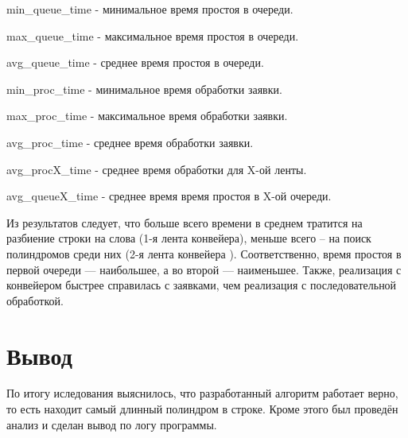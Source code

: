 
\noindent min\_queue\_time - минимальное время простоя в очереди.

\noindent max\_queue\_time - максимальное время простоя в очереди.

\noindent avg\_queue\_time - среднее время простоя в очереди.

\noindent min\_proc\_time - минимальное время обработки заявки.

\noindent max\_proc\_time - максимальное время обработки заявки.

\noindent avg\_proc\_time - среднее время обработки заявки.

\noindent avg\_procX\_time - среднее время обработки для X-ой ленты.

\noindent avg\_queueX\_time - среднее время время простоя в X-ой очереди.

\newpage
Из результатов следует, что больше всего  времени в среднем тратится на разбиение строки на слова (1-я лента конвейера), меньше всего -- на поиск полиндромов среди них (2-я лента конвейера
). Соответственно, время простоя в первой очереди --- наибольшее, а во второй --- наименьшее. Также, реализация с конвейером быстрее справилась с заявками, чем реализация с последовательной обработкой.

\section{Вывод}
По итогу иследования выяснилось, что разработанный алгоритм работает верно, то есть находит самый длинный полиндром в строке. Кроме этого был проведён анализ и сделан вывод по логу программы.